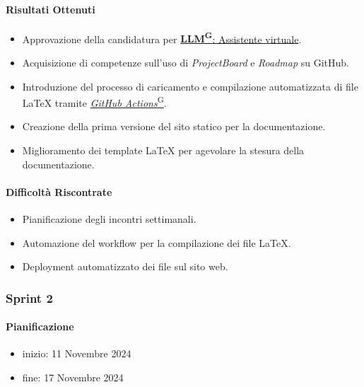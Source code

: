\documentclass{article}
\begin{document}
                \paragraph{Risultati Ottenuti}
                    \begin{itemize}
                        \item Approvazione della candidatura per \href{https://code7crusaders.github.io/docs/RTB/documentazione_interna/glossario.html#llm-large-language-model}{\textbf{LLM\textsuperscript{G}}: Assistente virtuale}.
                        \item Acquisizione di competenze sull'uso di \emph{ProjectBoard} e \emph{Roadmap} su GitHub.
                        \item Introduzione del processo di caricamento e compilazione automatizzata di file LaTeX tramite \href{https://code7crusaders.github.io/docs/RTB/documentazione_interna/glossario.html#github-actions}{\emph{GitHub Actions}\textsuperscript{G}}.
                        \item Creazione della prima versione del sito statico per la documentazione.
                        \item Miglioramento dei template LaTeX per agevolare la stesura della documentazione.
                    \end{itemize}

                    \paragraph{Difficoltà Riscontrate}
                    \begin{itemize}
                        \item Pianificazione degli incontri settimanali.
                        \item Automazione del workflow per la compilazione dei file LaTeX.
                        \item Deployment automatizzato dei file sul sito web.
                    \end{itemize}
            \subsubsection{Sprint 2}
                \paragraph{Pianificazione}
                \begin{itemize}
                    \item inizio: 11 Novembre 2024
                    \item fine: 17 Novembre 2024
                \end{itemize}
\end{document}
